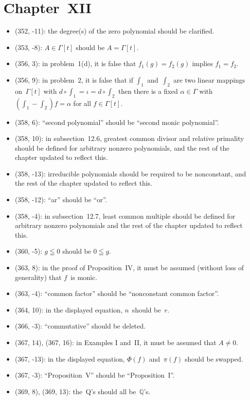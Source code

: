 \documentclass[letterpaper,12pt]{article}
\newcommand{\Q}{\mathbb{Q}}
\newcommand{\after}{\circ}
\begin{document}
\section*{Chapter~XII}
\begin{itemize}
\item (352, -11): the degree(s) of the zero polynomial should be clarified.
\item (353, -8): \(A\in\Gamma[t]\) should be \(A=\Gamma[t]\).
\item (356, 3): in problem~1(d), it is false that \(f_1(g)=f_2(g)\) implies \(f_1=f_2\).
\item (356, 9): in problem~2, it is false that if \(\int_1\) and~\(\int_2\) are two linear mappings on~\(\Gamma[t]\) with \(d\after\int_1=\iota=d\after\int_2\) then there is a fixed \(\alpha\in\Gamma\) with \((\int_1-\int_2)f=\alpha\) for all \(f\in\Gamma[t]\).
\item (358, 6): ``second polynomial'' should be ``second monic polynomial''.
\item (358, 10): in subsection~12.6, greatest common divisor and relative primality should be defined for arbitrary nonzero polynomials, and the rest of the chapter updated to reflect this.
\item (358, -13): irreducible polynomials should be required to be nonconstant, and the rest of the chapter updated to reflect this.
\item (358, -12): ``ar'' should be ``or''.
\item (358, -4): in subsection~12.7, least common multiple should be defined for arbitrary nonzero polynomials and the rest of the chapter updated to reflect this.
\item (360, -5): \(g\leqq 0\) should be \(0\leqq g\).
\item (363, 8): in the proof of Proposition~IV, it must be assumed (without loss of generality) that \(f\)~is monic.
\item (363, -4): ``common factor'' should be ``nonconstant common factor''.
\item (364, 10): in the displayed equation, \(n\)~should be~\(r\).
\item (366, -3): ``commutative'' should be deleted.
\item (367, 14), (367, 16): in Examples I and~II, it must be assumed that \(A\ne 0\).
\item (367, -13): in the displayed equation, \(\Phi(f)\) and~\(\pi(f)\) should be swapped.
\item (367, -3): ``Proposition~V'' should be ``Proposition~I''.
\item (369, 8), (369, 13): the~Q's should all be~\(\Q\)'s.
\end{itemize}
\end{document}
